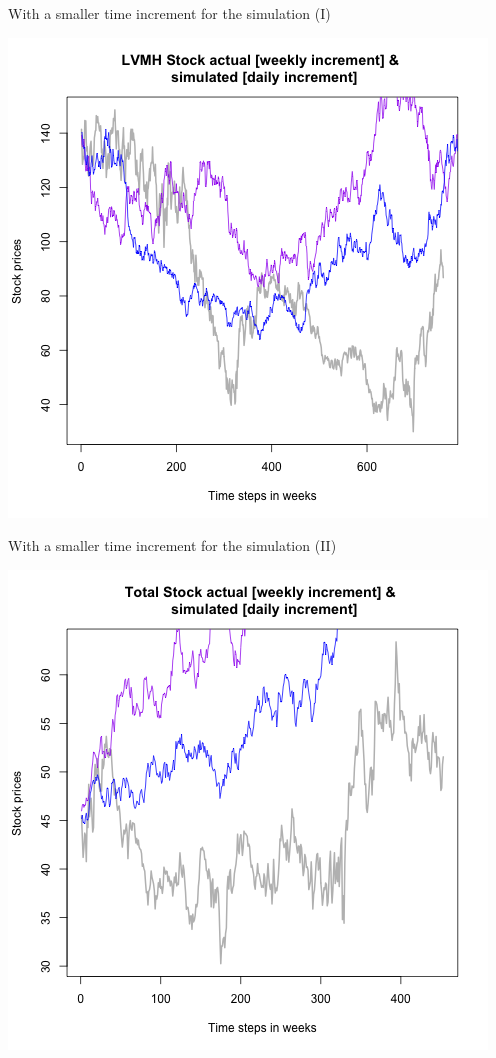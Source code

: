\documentclass{beamer}
\begin{document}
\begin{frame}{With a smaller time increment for the simulation (I)}
	\begin{center}
		\includegraphics[scale = 0.45]{cleanedLVMH_better_simulation.png}
	\end{center}
\end{frame}

\begin{frame}{With a smaller time increment for the simulation (II)}
	\begin{center}
		\includegraphics[scale = 0.45]{cleanedTotal_better_simulation.png}
	\end{center}
\end{frame}
\end{document}
